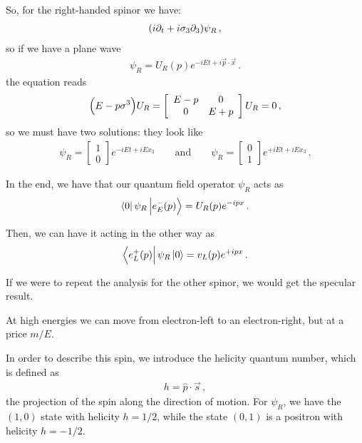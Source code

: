 \documentclass[main.tex]{subfiles}
\begin{document}
So, for the right-handed spinor we have:
%
\begin{align}
\qty(i \partial_{t} + i \sigma_{3} \partial_3 ) \psi_{R}
\,,
\end{align}
%
so if we have a plane wave 
%
\begin{align}
\psi_{R} = U_R (p) e^{-iEt + i \vec{p} \cdot \vec{x}}
\,.
\end{align}
%
the equation reads 
%
\begin{align}
\qty(E - p \sigma^{3}) U_R = \left[\begin{array}{cc}
E-p & 0 \\ 
0 & E+p
\end{array}\right] U_{R} = 0
\,,
\end{align}
%
so we must have two solutions: they look like 
%
\begin{align}
\psi_{R} = \left[\begin{array}{c}
1 \\ 
0
\end{array}\right] e^{-i Et + i E x_3 }
\qquad \text{and} \qquad
\psi_{R} = \left[\begin{array}{c}
0 \\ 
1
\end{array}\right] e^{+i Et + i E x_3 }  
\,.
\end{align}


In the end, we have that our quantum field operator \(\psi_{R}\) acts as 
%
\begin{align}
\bra{0}\psi_{R} \ket{e^{-}_{E} (p)} = U_R(p) e^{-ipx}
\,.
\end{align}

Then, we can have it acting in the other way as 
%
\begin{align}
\bra{e^{+}_{L}(p)} \psi_{R} \ket{0} = v_L (p) e^{+ipx}
\,.
\end{align}


If we were to repeat the analysis for the other spinor, we would get the specular result. 

At high energies we can move from electron-left to an electron-right, but at a price \(m / E\). 

In order to describe this spin, we introduce the helicity quantum number, which is defined as 
%
\begin{align}
h = \hat{p} \cdot \vec{s}
\,,
\end{align}
%
the projection of the spin along the direction of motion. 
For \(\psi_{R}\), we have the \((1,0)\) state with helicity \(h = 1/2\), while the state \((0,1)\) is a positron with helicity \(h = - 1/2\). 
\end{document}
